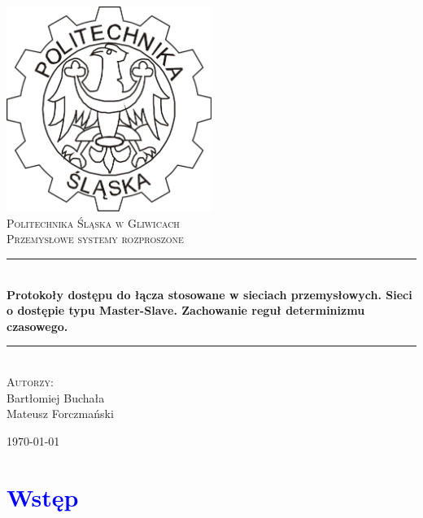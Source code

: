\documentclass[a4paper,twoside]{article}
\newcommand{\HRule}{\rule{\linewidth}{0.5mm}}
\begin{document}
	
	\begin{titlepage}
		\begin{center}
			
			\includegraphics[width=0.5\textwidth]{./img/logo.png}~\\[1cm]
			
			\textsc{\LARGE Politechnika Śląska w Gliwicach}\\[1.5cm]
			
			\textsc{\Large Przemysłowe systemy rozproszone}\\[0.5cm]
			
			\HRule \\[0.4cm]
			{ \huge \bfseries Protokoły dostępu do łącza stosowane w sieciach przemysłowych. Sieci o dostępie typu Master-Slave. Zachowanie reguł determinizmu czasowego.  \\[0.4cm] }
			
			\HRule \\[1.5cm]
			
			\textsc{\Large Autorzy:} \\
			Bartłomiej Buchała \\
			Mateusz Forczmański\\
			
			\vfill
			
			{\large \today}
			
		\end{center}
	\end{titlepage}
	
\newpage

\section{\textcolor{blue}{Wstęp}}
\end{document}
